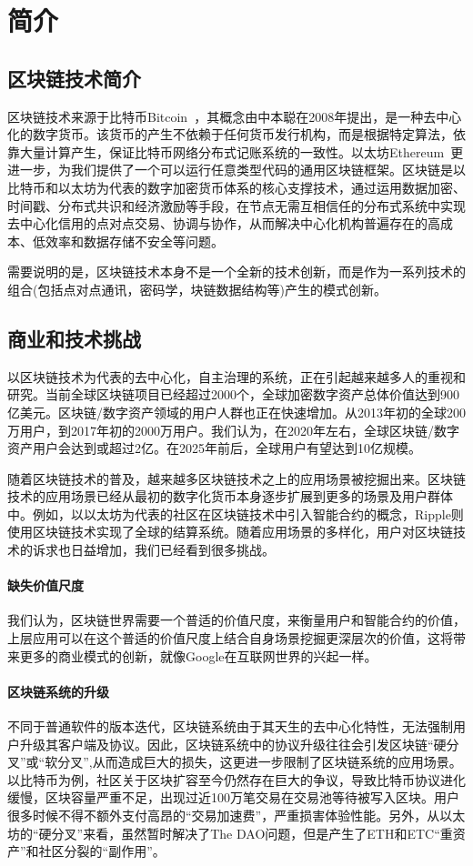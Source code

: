 \section{简介}

\subsection{区块链技术简介}
区块链技术来源于比特币Bitcoin~\cite{Nakamoto2008}，其概念由中本聪在2008年提出，是一种去中心化的数字货币。该货币的产生不依赖于任何货币发行机构，而是根据特定算法，依靠大量计算产生，保证比特币网络分布式记账系统的一致性。以太坊Ethereum~\cite{buterin2014ethereum}更进一步，为我们提供了一个可以运行任意类型代码的通用区块链框架。区块链是以比特币和以太坊为代表的数字加密货币体系的核心支撑技术，通过运用数据加密、时间戳、分布式共识和经济激励等手段，在节点无需互相信任的分布式系统中实现去中心化信用的点对点交易、协调与协作，从而解决中心化机构普遍存在的高成本、低效率和数据存储不安全等问题。

需要说明的是，区块链技术本身不是一个全新的技术创新，而是作为一系列技术的组合(包括点对点通讯，密码学，块链数据结构等)产生的模式创新。

\subsection{商业和技术挑战}
以区块链技术为代表的去中心化，自主治理的系统，正在引起越来越多人的重视和研究。当前全球区块链项目已经超过2000个，全球加密数字资产总体价值达到900亿美元。区块链/数字资产领域的用户人群也正在快速增加。从2013年初的全球200万用户，到2017年初的2000万用户。我们认为，在2020年左右，全球区块链/数字资产用户会达到或超过2亿。在2025年前后，全球用户有望达到10亿规模。

随着区块链技术的普及，越来越多区块链技术之上的应用场景被挖掘出来。区块链技术的应用场景已经从最初的数字化货币本身逐步扩展到更多的场景及用户群体中。例如，以以太坊为代表的社区在区块链技术中引入智能合约的概念，Ripple则使用区块链技术实现了全球的结算系统。随着应用场景的多样化，用户对区块链技术的诉求也日益增加，我们已经看到很多挑战。

\paragraph{缺失价值尺度}我们认为，区块链世界需要一个普适的价值尺度，来衡量用户和智能合约的价值，上层应用可以在这个普适的价值尺度上结合自身场景挖掘更深层次的价值，这将带来更多的商业模式的创新，就像Google在互联网世界的兴起一样。

\paragraph{区块链系统的升级}不同于普通软件的版本迭代，区块链系统由于其天生的去中心化特性，无法强制用户升级其客户端及协议。因此，区块链系统中的协议升级往往会引发区块链“硬分叉”或“软分叉”,从而造成巨大的损失，这更进一步限制了区块链系统的应用场景。以比特币为例，社区关于区块扩容至今仍然存在巨大的争议，导致比特币协议进化缓慢，区块容量严重不足，出现过近100万笔交易在交易池等待被写入区块。用户很多时候不得不额外支付高昂的“交易加速费”，严重损害体验性能。另外，从以太坊的“硬分叉”来看，虽然暂时解决了The
DAO问题，但是产生了ETH和ETC“重资产”和社区分裂的“副作用”。

